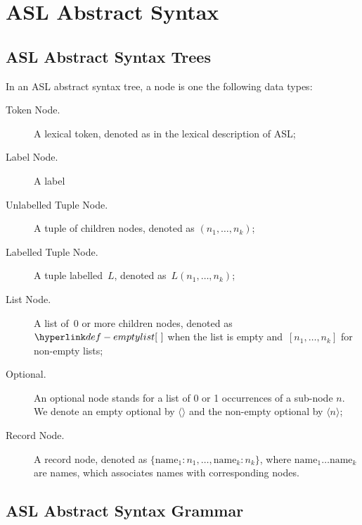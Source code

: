 \documentclass{book}
\begin{document}
\chapter{ASL Abstract Syntax}

\section{ASL Abstract Syntax Trees}

In an ASL abstract syntax tree, a node is one the following data types:
\begin{description}
\item[Token Node.] A lexical token, denoted as in the lexical description of ASL;
\item[Label Node.] A label
\item[Unlabelled Tuple Node.] A tuple of children nodes, denoted as $(n_1,\ldots,n_k)$;
\item[Labelled Tuple Node.] A tuple labelled~$L$, denoted as~$L(n_1,\ldots,n_k)$;
\item[List Node.] A list of~$0$ or more children nodes, denoted as~$\emptylist$
when the list is empty and~$[n_1,\ldots,n_k]$ for non-empty lists;
\item[Optional.] An optional node stands for a list of 0 or 1 occurrences of a sub-node $n$. We denote an empty optional by $\langle\rangle$ and the non-empty optional by $\langle n \rangle$;
\item[Record Node.] A record node, denoted as $\{\text{name}_1 : n_1,\ldots,\text{name}_k : n_k\}$, where $\text{name}_1 \ldots \text{name}_k$ are names, which associates names with corresponding nodes.
\end{description}

\newpage

\section{ASL Abstract Syntax Grammar}
\end{document}
